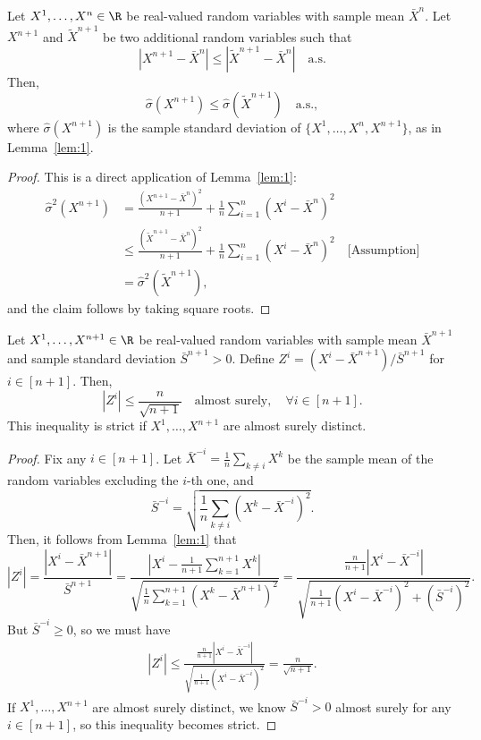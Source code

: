 \begin{lemma}\label{lem:2}
    Let $X^1,\ldots, X^n \in \R$ be real-valued random variables with sample mean $\bar{X}^n$. Let $X^{n+1}$ and $\tilde{X}^{n+1}$ be two additional random variables such that
    \[
    |X^{n+1} - \bar{X}^n| \leq |\tilde{X}^{n+1}-\bar{X}^n| \quad \text{a.s.}
    \]
    Then,
    \[
    \hat{\sigma}(X^{n+1}) \leq \hat{\sigma}(\tilde{X}^{n+1}) \quad \text{a.s.},
    \]
    where $\hat{\sigma}(X^{n+1})$ is the sample standard deviation of $\{X^1,\ldots,X^n, X^{n+1}\}$, as in Lemma~\ref{lem:1}.
\end{lemma}
\begin{proof}
    This is a direct application of Lemma~\ref{lem:1}:
\begin{align*}
    \hat{\sigma}^2(X^{n+1}) 
    &= \frac{(X^{n+1}-\bar{X}^{n})^2}{n+1}+\frac{1}{n}\sum^n_{i=1}(X^i-\bar{X}^{n})^2\\
    &\leq \frac{(\tilde{X}^{n+1}-\bar{X}^{n})^2}{n+1}+\frac{1}{n}\sum^n_{i=1}(X^i-\bar{X}^{n})^2 \quad \text{[Assumption]}\\
    &=\hat{\sigma}^2(\tilde{X}^{n+1}),
\end{align*}
and the claim follows by taking square roots.
\end{proof}


\begin{lemma}\label{lem:3}
    Let $X^1,\ldots, X^{n+1} \in \R$ be real-valued random variables with sample mean $\bar{X}^{n+1}$ and sample standard deviation $\bar{S}^{n+1} > 0$. Define $Z^i = (X^i-\bar{X}^{n+1}) / \bar{S}^{n+1}$ for $i \in [n+1]$. Then,
    \[
    |Z^i| \leq \frac{n}{\sqrt{n+1}} \quad\text{almost surely}, \quad \forall i \in [n+1].
    \]
    This inequality is strict if $X^1,\ldots,X^{n+1}$ are almost surely distinct.
\end{lemma}
\begin{proof}
Fix any $i\in [n+1]$.
Let $\bar{X}^{-i} = \frac{1}{n}\sum_{k\neq i}X^k$ be the sample mean of the random variables excluding the $i$-th one, and
\[
\bar{S}^{-i} = \sqrt{\frac{1}{n}\sum_{k\neq i}(X^k - \bar{X}^{-i})^2}.
\]
Then, it follows from Lemma~\ref{lem:1} that
\[
|Z^i| = \frac{|X^i-\bar{X}^{n+1}|}{\bar{S}^{n+1}}
    = \frac{\left|X^i - \frac{1}{n+1}\sum^{n+1}_{k=1}X^k\right|}{\sqrt{\frac{1}{n}\sum^{n+1}_{k=1}(X^k - \bar{X}^{n+1})^2}}=\frac{\frac{n}{n+1}|X^i - \bar{X}^{-i}|}{\sqrt{\frac{1}{n+1}(X^i-\bar{X}^{-i})^2+(\bar{S}^{-i})^2}}.
\]
But $\bar{S}^{-i} \geq 0$, so we must have
\begin{align*}
    |Z^i|\leq \frac{\frac{n}{n+1}|X^i - \bar{X}^{-i}|}{\sqrt{\frac{1}{n+1}(X^i-\bar{X}^{-i})^2}}= \frac{n}{\sqrt{n+1}}.
\end{align*}
If $X^1,\ldots,X^{n+1}$ are almost surely distinct, we know $\bar{S}^{-i} >0$ almost surely for any $i \in [n+1]$, so this inequality becomes strict.
\end{proof}


